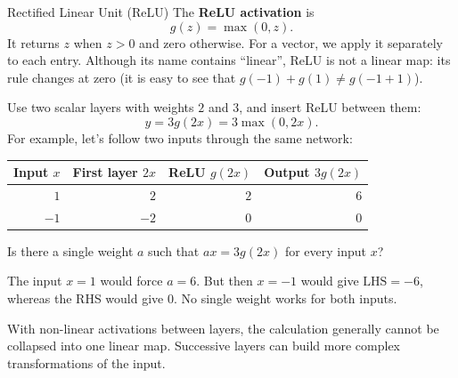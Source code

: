 \documentclass[a4paper,12pt,oneside]{report}
\begin{document}
\begin{frameddefn}{Rectified Linear Unit (ReLU)}\label{def:relu}
The \textbf{ReLU activation} is
\[
  g(z)=\max(0,z).
\]
It returns $z$ when $z>0$ and zero otherwise. For a vector, we apply
it separately to each entry. Although its name contains ``linear'',
ReLU is not a linear map: its rule changes at zero
(it is easy to see that $g(-1)+g(1)\neq g(-1+1)$).
\begin{center}
\end{center}
\end{frameddefn}

\begin{framedexample}{}\label{ex:relu-between-two-layers}
Use two scalar layers with weights $2$ and $3$, and insert ReLU
between them:
\[
  y=3g(2x)=3\max(0,2x).
\]
For example, let's follow two inputs through the same network:
\begin{center}
\begin{tabular}{@{}rrrr@{}}
\toprule
Input $x$ & First layer $2x$ & ReLU $g(2x)$ & Output $3g(2x)$\\
\midrule
$1$ & $2$ & $2$ & $6$\\
$-1$ & $-2$ & $0$ & $0$\\
\bottomrule
\end{tabular}
\end{center}
Is there a single weight $a$ such that $ax=3g(2x)$ for every
input $x$?

The input $x=1$ would force $a=6$. But then $x=-1$ would give
$\text{LHS}=-6$, whereas the RHS would give $0$. No single weight works
for both inputs.
\end{framedexample}

With non-linear activations between layers, the calculation generally
cannot be collapsed into one linear map. Successive
layers can build more complex transformations of the input.
\end{document}
